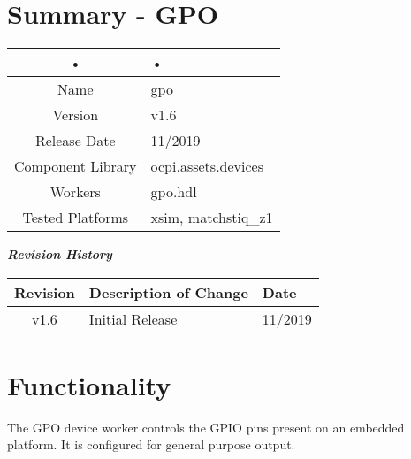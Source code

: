 \documentclass{article}
\author{} %
\date{Version \docVersion} %
\title{\docTitle}
\def\docVersion{1.6}
\begin{document}
\section*{Summary - GPO}
	\begin{tabular}{|c|M{13.5cm}|}
		\hline
		• & • \\
		\hline
		Name & gpo \\
		\hline
		Version & v\docVersion \\
		\hline
		Release Date & 11/2019 \\
		\hline
		Component Library & ocpi.assets.devices \\
		\hline
		Workers & gpo.hdl \\
		\hline
		Tested Platforms & xsim, matchstiq\_z1 \\
		\hline
	\end{tabular}
	
\begin{center}
	\textit{\textbf{Revision History}}
		\begin{table}[H]
		\label{table:revisions} %
			\begin{tabularx}{\textwidth}{|c|X|l|}
			\hline
			\rowcolor{blue}
			\textbf{Revision} & \textbf{Description of Change} & \textbf{Date} \\
		    \hline
		    v1.6 & Initial Release & 11/2019 \\
		    \hline
			\end{tabularx}
		\end{table}
	\end{center}	
	
\section*{Functionality}
\begin{flushleft}
The GPO device worker controls the GPIO pins present on an embedded platform. It is configured for general purpose output.

\end{flushleft}
\end{document}
